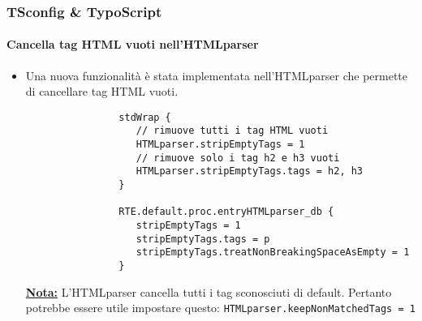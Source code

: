 \begin{frame}[fragile]
	\frametitle{TSconfig \& TypoScript}
	\framesubtitle{Cancella tag HTML vuoti nell'HTMLparser}

	\lstset{basicstyle=\tiny\ttfamily}

	\begin{itemize}
		\item Una nuova funzionalità è stata implementata nell'HTMLparser che permette di
			cancellare tag HTML vuoti.

			\begin{lstlisting}
				stdWrap {
				   // rimuove tutti i tag HTML vuoti
				   HTMLparser.stripEmptyTags = 1
				   // rimuove solo i tag h2 e h3 vuoti
				   HTMLparser.stripEmptyTags.tags = h2, h3
				}

				RTE.default.proc.entryHTMLparser_db {
				   stripEmptyTags = 1
				   stripEmptyTags.tags = p
				   stripEmptyTags.treatNonBreakingSpaceAsEmpty = 1
				}
			\end{lstlisting}

			\underline{\textbf{Nota:}}
				L'HTMLparser cancella tutti i tag sconosciuti di default.\newline
				Pertanto potrebbe essere utile impostare questo:\newline
				\texttt{HTMLparser.keepNonMatchedTags = 1}

	\end{itemize}

\end{frame}

